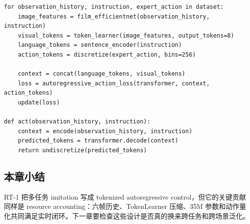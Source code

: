 \begin{lstlisting}[caption={RT-1-style tokenized imitation loop},label={lst:rt1-loop}]
for observation_history, instruction, expert_action in dataset:
    image_features = film_efficientnet(observation_history, instruction)
    visual_tokens = token_learner(image_features, output_tokens=8)
    language_tokens = sentence_encoder(instruction)
    action_tokens = discretize(expert_action, bins=256)

    context = concat(language_tokens, visual_tokens)
    loss = autoregressive_action_loss(transformer, context, action_tokens)
    update(loss)

def act(observation_history, instruction):
    context = encode(observation_history, instruction)
    predicted_tokens = transformer.decode(context)
    return undiscretize(predicted_tokens)
\end{lstlisting}

\subsection{本章小结}

RT-1 把多任务 imitation 写成 tokenized autoregressive control，但它的关键贡献同样是 resource accounting：六帧历史、TokenLearner 压缩、35M 参数和动作量化共同满足实时闭环。下一章要检查这些设计是否真的换来跨任务和跨场景泛化。

